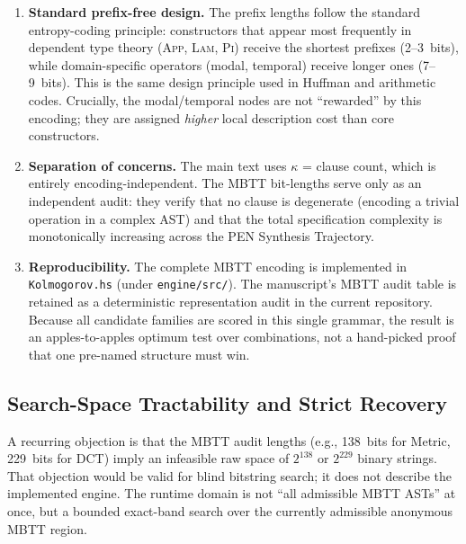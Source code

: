 \documentclass[11pt,a4paper]{article}
\theoremstyle{plain}
\theoremstyle{definition}
\theoremstyle{remark}
\begin{document}
\begin{enumerate}[nosep]
\item \textbf{Standard prefix-free design.}
The prefix lengths follow the standard entropy-coding principle: constructors that appear most frequently in dependent type theory (\textsc{App}, \textsc{Lam}, \textsc{Pi}) receive the shortest prefixes (2--3~bits), while domain-specific operators (modal, temporal) receive longer ones (7--9~bits).
This is the same design principle used in Huffman and arithmetic codes.
Crucially, the modal/temporal nodes are not ``rewarded'' by this encoding; they are assigned \emph{higher} local description cost than core constructors.

\item \textbf{Separation of concerns.}
The main text uses $\kappa$ = clause count, which is entirely encoding-independent.
The MBTT bit-lengths serve only as an independent audit: they verify that no clause is degenerate (encoding a trivial operation in a complex AST) and that the total specification complexity is monotonically increasing across the PEN Synthesis Trajectory.

\item \textbf{Reproducibility.}
The complete MBTT encoding is implemented in \texttt{Kolmogorov.hs} (under \texttt{engine/src/}).
The manuscript's MBTT audit table is retained as a deterministic representation audit in the current repository.
Because all candidate families are scored in this single grammar, the result is an apples-to-apples optimum test over combinations, not a hand-picked proof that one pre-named structure must win.
\end{enumerate}

\subsection{Search-Space Tractability and Strict Recovery}
\label{sec:search-tractability}

A recurring objection is that the MBTT audit lengths (e.g., 138~bits for Metric, 229~bits for DCT) imply an infeasible raw space of $2^{138}$ or $2^{229}$ binary strings.
That objection would be valid for blind bitstring search; it does not describe the implemented engine.
The runtime domain is not ``all admissible MBTT ASTs'' at once, but a bounded exact-band search over the currently admissible anonymous MBTT region.
\end{document}
